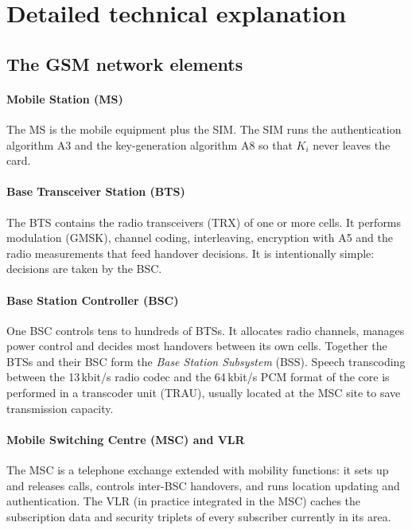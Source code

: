 \documentclass[11pt,a4paper]{article}
\begin{document}
\section{Detailed technical explanation}\label{sec:technical}

\subsection{The GSM network elements}
\paragraph{Mobile Station (MS)} The MS is the mobile equipment plus the SIM. The SIM
runs the authentication algorithm A3 and the key-generation algorithm A8 so that
$K_i$ never leaves the card.

\paragraph{Base Transceiver Station (BTS)} The BTS contains the radio transceivers
(TRX) of one or more cells. It performs modulation (GMSK), channel coding,
interleaving, encryption with A5 and the radio measurements that feed handover
decisions. It is intentionally simple: decisions are taken by the BSC.

\paragraph{Base Station Controller (BSC)} One BSC controls tens to hundreds of BTSs.
It allocates radio channels, manages power control and decides most handovers
between its own cells. Together the BTSs and their BSC form the \emph{Base Station
Subsystem} (BSS). Speech transcoding between the 13\,kbit/s radio codec and the
64\,kbit/s PCM format of the core is performed in a transcoder unit (TRAU), usually
located at the MSC site to save transmission capacity.

\paragraph{Mobile Switching Centre (MSC) and VLR} The MSC is a telephone exchange
extended with mobility functions: it sets up and releases calls, controls inter-BSC
handovers, and runs location updating and authentication. The VLR (in practice
integrated in the MSC) caches the subscription data and security triplets of every
subscriber currently in its area.
\end{document}
